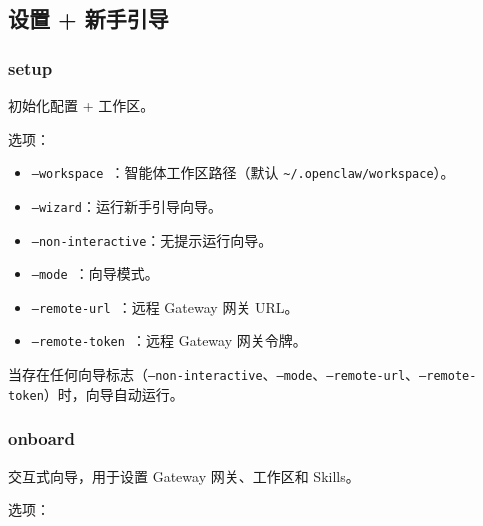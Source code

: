 \subsection{设置 + 新手引导}


\subsubsection{setup}


初始化配置 + 工作区。

选项：

\begin{itemize}
  \item \texttt{--workspace }：智能体工作区路径（默认 \texttt{\textasciitilde{}/.openclaw/workspace}）。
  \item \texttt{--wizard}：运行新手引导向导。
  \item \texttt{--non-interactive}：无提示运行向导。
  \item \texttt{--mode }：向导模式。
  \item \texttt{--remote-url }：远程 Gateway 网关 URL。
  \item \texttt{--remote-token }：远程 Gateway 网关令牌。
\end{itemize}


当存在任何向导标志（\texttt{--non-interactive}、\texttt{--mode}、\texttt{--remote-url}、\texttt{--remote-token}）时，向导自动运行。

\subsubsection{onboard}


交互式向导，用于设置 Gateway 网关、工作区和 Skills。

选项：

